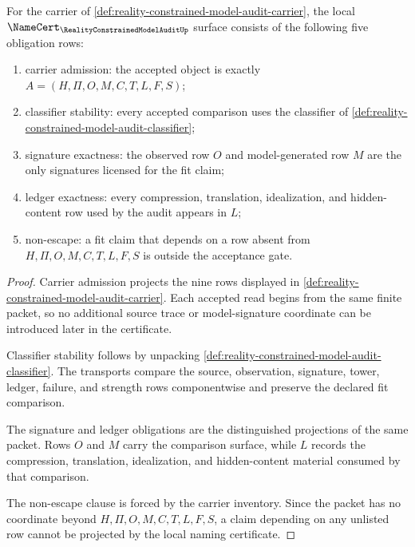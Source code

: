 \begin{theorem}
\label{thm:reality-constrained-model-audit-namecert-obligations}
For the carrier of \autoref{def:reality-constrained-model-audit-carrier}, the local $\NameCert_{\RealityConstrainedModelAuditUp}$ surface consists of the following five obligation rows:
\begin{enumerate}
\item carrier admission: the accepted object is exactly $A=(H,\Pi,O,M,C,T,L,F,S)$;
\item classifier stability: every accepted comparison uses the classifier of \autoref{def:reality-constrained-model-audit-classifier};
\item signature exactness: the observed row $O$ and model-generated row $M$ are the only signatures licensed for the fit claim;
\item ledger exactness: every compression, translation, idealization, and hidden-content row used by the audit appears in $L$;
\item non-escape: a fit claim that depends on a row absent from $H,\Pi,O,M,C,T,L,F,S$ is outside the acceptance gate.
\end{enumerate}
\end{theorem}
\begin{proof}
Carrier admission projects the nine rows displayed in \autoref{def:reality-constrained-model-audit-carrier}. Each accepted read begins from the same finite packet, so no additional source trace or model-signature coordinate can be introduced later in the certificate.

Classifier stability follows by unpacking \autoref{def:reality-constrained-model-audit-classifier}. The transports compare the source, observation, signature, tower, ledger, failure, and strength rows componentwise and preserve the declared fit comparison.

The signature and ledger obligations are the distinguished projections of the same packet. Rows $O$ and $M$ carry the comparison surface, while $L$ records the compression, translation, idealization, and hidden-content material consumed by that comparison.

The non-escape clause is forced by the carrier inventory. Since the packet has no coordinate beyond $H,\Pi,O,M,C,T,L,F,S$, a claim depending on any unlisted row cannot be projected by the local naming certificate.
\end{proof}


